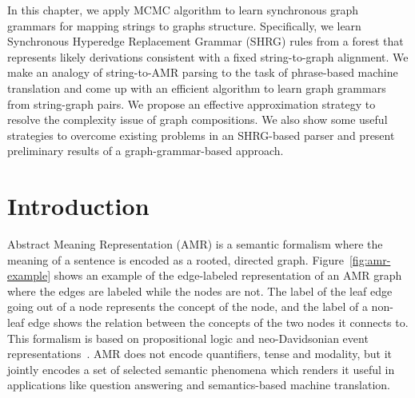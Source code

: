 In this chapter, we apply MCMC algorithm to learn synchronous graph grammars for mapping strings
to graphs structure. Specifically, we learn Synchronous Hyperedge Replacement Grammar (SHRG) rules from a forest that represents likely derivations consistent with a fixed string-to-graph 
alignment. We make an analogy of string-to-AMR parsing to the task of phrase-based machine translation and
come up with an efficient algorithm to learn graph grammars from string-graph pairs. We propose an effective
approximation strategy to resolve the complexity issue of graph compositions. We also show some useful strategies
to overcome existing problems in an SHRG-based parser and present preliminary results of a graph-grammar-based approach. 
\section{Introduction} 
Abstract Meaning Representation (AMR) \cite{banarescu2013abstract} is a semantic formalism where the meaning 
of a sentence is encoded as a rooted, directed graph. 
Figure~\ref{fig:amr-example} shows an example of the edge-labeled representation of an AMR 
graph where the edges are labeled while the nodes are not. The label of the leaf edge going out of a node represents 
the concept of the node, and the label of a non-leaf edge shows the relation between the concepts of the two nodes it connects to. 
This formalism is based on propositional logic and neo-Davidsonian event representations~\cite{parsons1990events,Davidson:1967}.
AMR does not encode quantifiers, tense and modality, but it jointly encodes a set of selected semantic phenomena which renders
it useful in applications like question answering and semantics-based machine translation.

